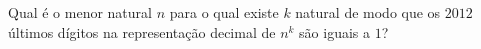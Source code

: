 Qual é o menor natural $n$ para o qual existe $k$ natural de modo que os $2012$ últimos dígitos na representação decimal de $n^k$ são iguais a $1$?
